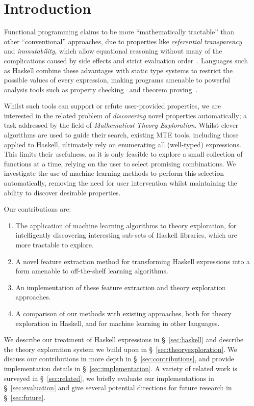 \section{Introduction}

Functional programming claims to be more ``mathematically tractable'' than other
``conventional'' approaches, due to properties like \emph{referential
transparency} and \emph{immutability}, which allow equational reasoning without
many of the complications caused by side effects and strict evaluation
order~\cite{hughes1989functional}. Languages such as Haskell combine these
advantages with static type systems to restrict the possible values of every
expression, making programs amenable to powerful analysis tools such as property
checking~\cite{claessen2011quickcheck} and theorem
proving~\cite{rosen2012proving}.

Whilst such tools can support or refute user-provided properties, we are
interested in the related problem of \emph{discovering} novel properties
automatically; a task addressed by the field of \emph{Mathematical Theory
  Exploration}. Whilst clever algorithms are used to guide their search,
existing MTE tools, including those applied to Haskell, ultimately rely on
enumerating all (well-typed) expressions. This limits their usefulness, as it is
only feasible to explore a small collection of functions at a time, relying on
the user to select promising combinations. We investigate the use of machine
learning methods to perform this selection automatically, removing the need for
user intervention whilst maintaining the ability to discover desirable
properties.

Our contributions are:

\begin{enumerate}
  \item The application of machine learning algorithms to theory exploration,
    for intelligently discovering interesting sub-sets of Haskell libraries,
    which are more tractable to explore.
  \item A novel feature extraction method for transforming Haskell expressions
    into a form amenable to off-the-shelf learning algorithms.
  \item An implementation of these feature extraction and theory exploration
    approaches.
  \item A comparison of our methods with existing approaches, both for theory
    exploration in Haskell, and for machine learning in other languages.
\end{enumerate}

We describe our treatment of Haskell expressions in \S~\ref{sec:haskell} and
describe the \qspec{} theory exploration system we build upon in
\S~\ref{sec:theoryexploration}. We discuss our contributions in more depth in
\S~\ref{sec:contributions}, and provide implementation details in
\S~\ref{sec:implementation}. A variety of related work is surveyed in
\S~\ref{sec:related}, we briefly evaluate our implementations in
\S~\ref{sec:evaluation} and give several potential directions for future
research in \S~\ref{sec:future}.
